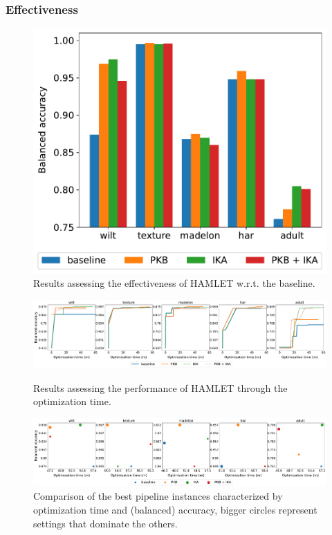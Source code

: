 \subsubsection{Effectiveness}
\begin{figure}[t]
    \centering
    \includegraphics[scale=.45]{chapters/part-automl/chapter-supervised/img-hamlet/accuracy.pdf}
    \caption{Results assessing the effectiveness of HAMLET w.r.t. the baseline.}
    \label{fig:effectiveness}
\end{figure}

\begin{figure}[h!]
    \RawFloats
    \centering
    \includegraphics[scale=.25]{chapters/part-automl/chapter-supervised/img-hamlet/accuracy_time.pdf}
    \caption{Results assessing the performance of HAMLET through the optimization time.}
    \label{fig:efficiency}
    \includegraphics[scale=.25]{chapters/part-automl/chapter-supervised/img-hamlet/skyline.pdf}
    \caption{Comparison of the best pipeline instances characterized by optimization time and (balanced) accuracy, bigger circles represent settings that dominate the others.}
    \label{fig:effskyline}
\end{figure}

